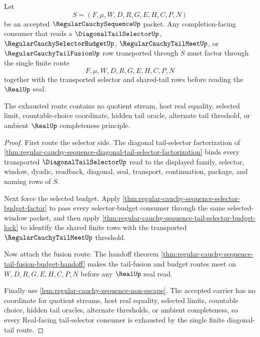 \begin{theorem}
\label{thm:regular-cauchy-sequence-tail-selector-exhaustion}
Let
$$
S=(F,\mu,W,D,R,G,E,H,C,P,N)
$$
be an accepted $\RegularCauchySequenceUp$ packet. Any completion-facing consumer that reads a $\DiagonalTailSelectorUp$, $\RegularCauchySelectorBudgetUp$, $\RegularCauchyTailMeetUp$, or $\RegularCauchyTailFusionUp$ row transported through $S$ must factor through the single finite route
$$
F,\mu,W,D,R,G,E,H,C,P,N
$$
together with the transported selector and shared-tail rows before reading the $\RealUp$ seal.

The exhausted route contains no quotient stream, host real equality, selected limit, countable-choice coordinate, hidden tail oracle, alternate tail threshold, or ambient $\RealUp$ completeness principle.
\end{theorem}
\begin{proof}
First route the selector side. The diagonal tail-selector factorization of \autoref{thm:regular-cauchy-sequence-diagonal-tail-selector-factorization} binds every transported $\DiagonalTailSelectorUp$ read to the displayed family, selector, window, dyadic, readback, diagonal, seal, transport, continuation, package, and naming rows of $S$.

Next force the selected budget. Apply \autoref{thm:regular-cauchy-sequence-selector-budget-factor} to pass every selector-budget consumer through the same selected-window packet, and then apply \autoref{thm:regular-cauchy-sequence-tail-selector-budget-lock} to identify the shared finite rows with the transported $\RegularCauchyTailMeetUp$ threshold.

Now attach the fusion route. The handoff theorem \autoref{thm:regular-cauchy-sequence-tail-fusion-budget-handoff} makes the tail-fusion and budget routes meet on $W,D,R,G,E,H,C,P,N$ before any $\RealUp$ seal read.

Finally use \autoref{lem:regular-cauchy-sequence-non-escape}. The accepted carrier has no coordinate for quotient streams, host real equality, selected limits, countable choice, hidden tail oracles, alternate thresholds, or ambient completeness, so every Real-facing tail-selector consumer is exhausted by the single finite diagonal-tail route.
\end{proof}


